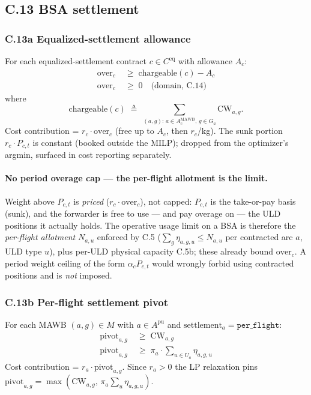 \documentclass[11pt,a4paper]{article}
\newcommand{\defeq}{\triangleq}
\theoremstyle{definition}
\begin{document}
\subsection*{C.13 BSA settlement}

\subsubsection*{C.13a Equalized-settlement allowance }

For each equalized-settlement contract $c \in C^{\text{eq}}$ with allowance $A_c$:
\begin{align}
  \text{over}_c &\;\geq\; \text{chargeable}(c) - A_c
    \tag{C.13a} \label{eq:C13a} \\
  \text{over}_c &\;\geq\; 0 \quad \text{(domain, C.14)}
\end{align}
where
\[
  \text{chargeable}(c) \;\defeq\; \sum_{(a, g) :\, a \in A_c^{\text{MAWB}},\, g \in G_a} \text{CW}_{a,g}.
\]
Cost contribution = $r_c \cdot \text{over}_c$ (free up to $A_c$, then $r_c$/kg).
The sunk portion $r_c \cdot P_{c,t}$ is constant (booked outside the MILP);
dropped from the optimizer's argmin, surfaced in cost reporting separately.

\paragraph{No period overage cap --- the per-flight allotment is the limit.}
Weight above $P_{c,t}$ is \emph{priced} ($r_c \cdot \text{over}_c$), not
capped: $P_{c,t}$ is the take-or-pay basis (sunk), and the forwarder is free
to use --- and pay overage on --- the ULD positions it actually holds. The
operative usage limit on a BSA is therefore the \emph{per-flight allotment}
$N_{a,u}$ enforced by C.5 ($\sum_g \eta_{a,g,u} \leq N_{a,u}$ per contracted
arc $a$, ULD type $u$), plus per-ULD physical capacity C.5b; these already
bound $\text{over}_c$. A period weight ceiling of the form $\alpha_c P_{c,t}$
would wrongly forbid using contracted positions and is \emph{not} imposed.

\subsubsection*{C.13b Per-flight settlement pivot }

For each MAWB $(a, g) \in M$ with $a \in A^{\text{pu}}$ and $\text{settlement}_a
= \texttt{per\_flight}$:
\begin{align}
  \text{pivot}_{a,g} &\;\geq\; \text{CW}_{a,g}
    \tag{C.13b-1} \label{eq:C13b-1} \\
  \text{pivot}_{a,g} &\;\geq\; \pi_a \cdot \sum_{u \in U_a} \eta_{a,g,u}
    \tag{C.13b-2} \label{eq:C13b-2}
\end{align}
Cost contribution = $r_a \cdot \text{pivot}_{a,g}$. Since $r_a > 0$ the LP
relaxation pins $\text{pivot}_{a,g} = \max(\text{CW}_{a,g},\, \pi_a \sum_u
\eta_{a,g,u})$.
\end{document}
